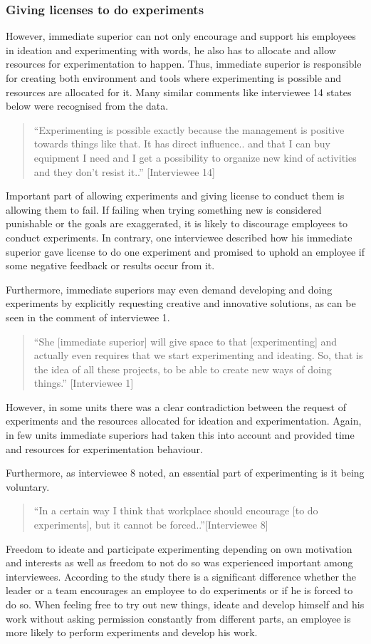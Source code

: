 \subsubsection{Giving licenses to do experiments}
However, immediate superior can not only encourage and support his employees in ideation and experimenting with words, he also has to allocate and allow resources for experimentation to happen. Thus, immediate superior is responsible for creating both environment and tools where experimenting is possible and resources are allocated for it. Many similar comments like interviewee 14 states below were recognised from the data. 
\begin{quote}
``Experimenting is possible exactly because the management is positive towards things like that. It has direct influence.. and that I can buy equipment I need and I get a possibility to organize new kind of activities and they don't resist it..'' [Interviewee 14]
\end{quote}
Important part of allowing experiments and giving license to conduct them is allowing them to fail. If failing when trying something new is considered punishable or the goals are exaggerated, it is likely to discourage employees to conduct experiments. In contrary, one interviewee described how his immediate superior gave license to do one experiment and promised to uphold an employee if some negative feedback or results occur from it. 

Furthermore, immediate superiors may even demand developing and doing experiments by explicitly requesting creative and innovative solutions, as can be seen in the comment of interviewee 1. 
\begin{quote}
``She [immediate superior] will give space to that [experimenting] and actually even requires that we start experimenting and ideating. So, that is the idea of all these projects, to be able to create new ways of doing things.'' [Interviewee 1]
\end{quote}
However, in some units there was a clear contradiction between the request of experiments and the resources allocated for ideation and experimentation. Again, in few units immediate superiors had taken this into account and provided time and resources for experimentation behaviour. 

Furthermore, as interviewee 8 noted, an essential part of experimenting is it being voluntary.
\begin{quote}
``In a certain way I think that workplace should encourage [to do experiments], but it cannot be forced..''[Interviewee 8]
\end{quote}
Freedom to ideate and participate experimenting depending on own motivation and interests as well as freedom to not do so was experienced important among interviewees. According to the study there is a significant difference whether the leader or a team encourages an employee to do experiments or if he is forced to do so. When feeling free to try out new things, ideate and develop himself and his work without asking permission constantly from different parts, an employee is more likely to perform experiments and develop his work.

